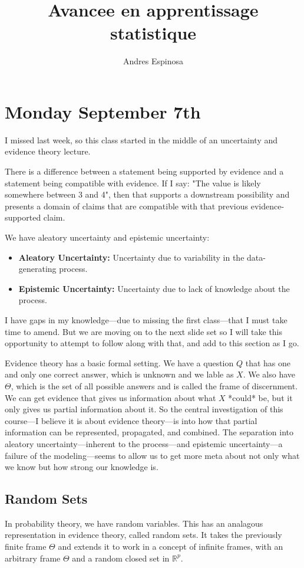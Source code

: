 \documentclass[11pt]{article}
\title{Avancee en apprentissage statistique}
\author{Andres Espinosa}
\begin{document}
\pgfplotsset{compat=1.18}
\maketitle

\tableofcontents
\section{Monday September 7th}
I missed last week, so this class started in the middle of an uncertainty and evidence theory lecture.

There is a difference between a statement being supported by evidence and a statement being compatible with evidence.
If I say: "The value is likely somewhere between 3 and 4", then that supports a downstream possibility and presents a domain of claims that are compatible with that previous evidence-supported claim.

We have aleatory uncertainty and epistemic uncertainty:
\begin{itemize}
    \item \textbf{Aleatory Uncertainty:} Uncertainty due to variability in the data-generating process.
    \item \textbf{Epistemic Uncertainty: } Uncertainty due to lack of knowledge about the process.
\end{itemize}

I have gaps in my knowledge—due to missing the first class—that I must take time to amend.
But we are moving on to the next slide set so I will take this opportunity to attempt to follow along with that, and add to this section as I go.

Evidence theory has a basic formal setting.
We have a question $Q$ that has one and only one correct answer, which is unknown and we lable as $X$.
We also have $\Theta$, which is the set of all possible answers and is called the frame of discernment.
We can get evidence that gives us information about what $X$ *could* be, but it only gives us partial information about it.
So the central investigation of this course—I believe it is about evidence theory—is into how that partial information can be represented, propagated, and combined.
The separation into aleatory uncertainty—inherent to the process—and epistemic uncertainty—a failure of the modeling—seems to allow us to get more meta about not only what we know but how strong our knowledge is.


\subsection{Random Sets}
In probability theory, we have random variables.
This has an analagous representation in evidence theory, called random sets.
It takes the previously finite frame $\Theta$ and extends it to work in a concept of infinite frames, with an arbitrary frame $\Theta$ and a random closed set in $\mathbb{R}^p$.
\end{document}
